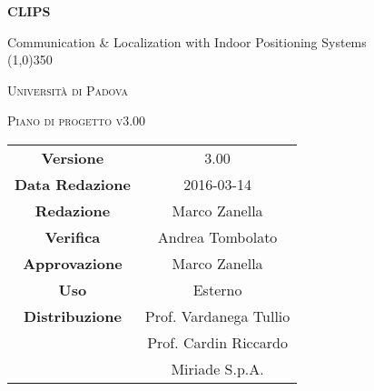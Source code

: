 \documentclass[a4paper,12pt]{article}
\author{Eduard Bicego, Federico Tavella, Andrea Tombolato}
\date{20/01/2016}
\begin{document}
	\begin{titlepage}
		\centering
		{\huge\bfseries CLIPS\par}
		Communication \& Localization with Indoor Positioning Systems \\
		\line(1,0){350} \\
		{\scshape\LARGE Università di Padova \par}
		\vspace{1cm}
		{\scshape\Large Piano di progetto v3.00\par}
		\logo
	
		\vfill \vfill
		\begin{tabular}{c|c}
			{\hfill \textbf{Versione}} 			&	3.00\\
			{\hfill\textbf{Data Redazione}} 	& 	2016-03-14\\
			{\hfill\textbf{Redazione}} 			&   Marco Zanella \\ 
			{\hfill\textbf{Verifica}} 			& 	Andrea Tombolato 	\\
			{\hfill\textbf{Approvazione}} 		& 	Marco Zanella \\
			{\hfill\textbf{Uso}} 				& Esterno			\\
			{\hfill\textbf{Distribuzione}} 		& Prof. Vardanega Tullio \\
												& Prof. Cardin Riccardo \\
												& Miriade S.p.A. \\
	\end{tabular}
\end{titlepage}

	\pagestyle{myfront}	
	
	\newpage
			
	\newpage
		\tableofcontents 	%
	\newpage
		\listoftables 		%
	\newpage	
		\listoffigures		%
	
	\label{LastFrontPage}

	\newpage
		\pagestyle{mymain}
	
	\newpage
		
	\newpage
		

	\newpage
		
		
	\newpage
		
		
	\newpage
			
		
	\newpage
			

    \newpage
		
	\newpage
		
        		
	\label{LastPage}
\end{document}

